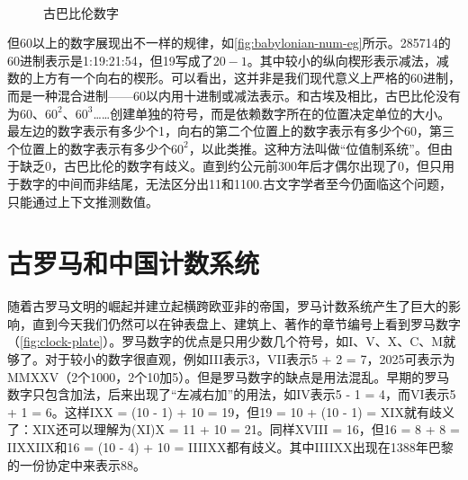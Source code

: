 \documentclass[b5paper]{ctexart}
\begin{document}
\begin{figure}[htbp]
 \centering
  \\
 \caption{古巴比伦数字}
\end{figure}

但60以上的数字展现出不一样的规律，如\cref{fig:babylonian-num-eg}所示。285714的60进制表示是1:19:21:54，但19写成了$20-1$。其中较小的纵向楔形表示减法，减数的上方有一个向右的楔形。可以看出，这并非是我们现代意义上严格的60进制，而是一种混合进制——60以内用十进制或减法表示。和古埃及相比，古巴比伦没有为$60$、$60^2$、$60^3$……创建单独的符号，而是依赖数字所在的位置决定单位的大小。最左边的数字表示有多少个1，向右的第二个位置上的数字表示有多少个60，第三个位置上的数字表示有多少个$60^2$，以此类推。这种方法叫做“位值制系统”。但由于缺乏0，古巴比伦的数字有歧义。直到约公元前300年后才偶尔出现了0，但只用于数字的中间而非结尾，无法区分出11和1100.古文字学者至今仍面临这个问题，只能通过上下文推测数值。

\section{古罗马和中国计数系统}

随着古罗马文明的崛起并建立起横跨欧亚非的帝国，罗马计数系统产生了巨大的影响，直到今天我们仍然可以在钟表盘上、建筑上、著作的章节编号上看到罗马数字（\cref{fig:clock-plate}）。罗马数字的优点是只用少数几个符号，如I、V、X、C、M就够了。对于较小的数字很直观，例如III表示3，VII表示5 + 2 = 7，2025可表示为MMXXV（2个1000，2个10加5）。但是罗马数字的缺点是用法混乱。早期的罗马数字只包含加法，后来出现了“左减右加”的用法，如IV表示5 - 1 = 4，而VI表示5 + 1 = 6。这样IXX = (10 - 1) + 10 = 19，但19 = 10 + (10 - 1) = XIX就有歧义了：XIX还可以理解为(XI)X = 11 + 10 = 21。同样XVIII = 16，但16 = 8 + 8 = IIXXIIX和16 = (10 - 4) + 10 = IIIIXX都有歧义。其中IIIIXX出现在1388年巴黎的一份协定中来表示88\cite{LeVeque-Smith-25}。
\end{document}
